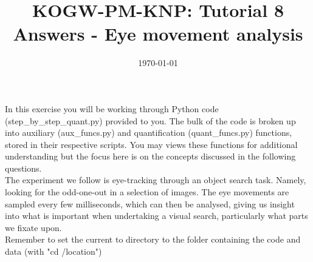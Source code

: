 \documentclass[12pt,english]{scrartcl}
\title{KOGW-PM-KNP: Tutorial 8 Answers - Eye movement analysis}
\author{}
\date{\today}
\begin{document}
\maketitle
In this exercise you will be working through Python code (step\_by\_step\_quant.py) provided to you. The bulk of the code is broken up into auxiliary (aux\_funcs.py) and quantification (quant\_funcs.py) functions, stored in their respective scripts. You may views these functions for additional understanding but the focus here is on the concepts discussed in the following questions. \\

The experiment we follow is eye-tracking through an object search task. Namely, looking for the odd-one-out in a selection of images. The eye movements are sampled every few milliseconds, which can then be analysed, giving us insight into what is important when undertaking a visual search, particularly what parts we fixate upon. \\

Remember to set the current to directory to the folder containing the code and data (with "cd /location")
\end{document}
